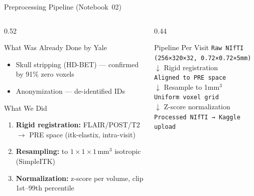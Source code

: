\documentclass[aspectratio=169, dvipsnames]{beamer}
\begin{document}
\begin{frame}{Preprocessing Pipeline (Notebook~02)}
    \begin{columns}
        \begin{column}{0.52\textwidth}
            \begin{block}{What Was Already Done by Yale}
                \small
                \begin{itemize}
                    \item[\textcolor{ForestGreen}{\faIcon{check}}] Skull stripping (HD-BET) — confirmed by 91\% zero voxels
                    \item[\textcolor{ForestGreen}{\faIcon{check}}] Anonymization — de-identified IDs
                \end{itemize}
            \end{block}

            \vspace{0.3em}

            \begin{block}{What We Did}
                \small
                \begin{enumerate}
                    \item \textbf{Rigid registration:} FLAIR/POST/T2 $\to$ PRE space (itk-elastix, intra-visit)
                    \item \textbf{Resampling:} to $1{\times}1{\times}1$\,mm$^3$ isotropic (SimpleITK)
                    \item \textbf{Normalization:} z-score per volume, clip 1st--99th percentile
                \end{enumerate}
            \end{block}
        \end{column}

        \begin{column}{0.44\textwidth}
            \begin{exampleblock}{Pipeline Per Visit}
                \scriptsize
                \texttt{Raw NIfTI (256×320×32, 0.72×0.72×5mm)}\\
                \quad $\downarrow$ Rigid registration\\
                \texttt{Aligned to PRE space}\\
                \quad $\downarrow$ Resample to 1mm$^3$\\
                \texttt{Uniform voxel grid}\\
                \quad $\downarrow$ Z-score normalization\\
                \texttt{Processed NIfTI → Kaggle upload}
            \end{exampleblock}


\end{column}
\end{columns}
\end{frame}
\end{document}
